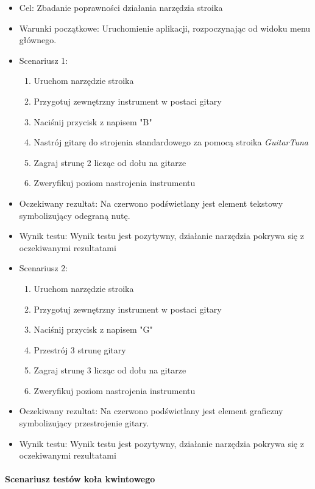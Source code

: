 \begin{itemize}
    \item Cel: Zbadanie poprawności działania narzędzia stroika
    \item Warunki początkowe: Uruchomienie aplikacji, rozpoczynając od widoku menu głównego. 
    \item Scenariusz 1:
        \begin{enumerate}
            \item Uruchom narzędzie stroika
            \item Przygotuj zewnętrzny instrument w postaci gitary
            \item Naciśnij przycisk z napisem "B"
            \item Nastrój gitarę do strojenia standardowego za pomocą stroika \emph{GuitarTuna}
            \item Zagraj strunę 2 licząc od dołu na gitarze
            \item Zweryfikuj poziom nastrojenia instrumentu
        \end{enumerate}
    \item Oczekiwany rezultat: Na czerwono podświetlany jest element tekstowy symbolizujący odegraną nutę.
    \item Wynik testu: Wynik testu jest pozytywny, działanie narzędzia pokrywa się z oczekiwanymi rezultatami
    \item Scenariusz 2:
        \begin{enumerate}
            \item Uruchom narzędzie stroika
            \item Przygotuj zewnętrzny instrument w postaci gitary
            \item Naciśnij przycisk z napisem "G"
            \item Przestrój 3 strunę gitary
            \item Zagraj strunę 3 licząc od dołu na gitarze
            \item Zweryfikuj poziom nastrojenia instrumentu
        \end{enumerate}
    \item Oczekiwany rezultat: Na czerwono podświetlany jest element graficzny symbolizujący przestrojenie gitary.
    \item Wynik testu: Wynik testu jest pozytywny, działanie narzędzia pokrywa się z oczekiwanymi rezultatami
\end{itemize}

\paragraph{Scenariusz testów koła kwintowego}

